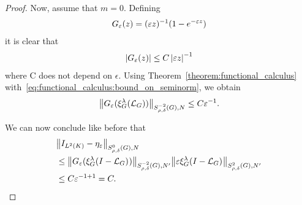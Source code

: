 \begin{proof}
    Now, assume that $m = 0$.
    Defining
    \begin{align*}
        G_\epsilon(z) = (\epsilon z)^{-1} (1 - \e^{-\epsilon z})
    \end{align*}
    it is clear that
    \begin{align*}
        \abs {G_\epsilon(z)} \leq C \abs {\epsilon z}^{-1}
    \end{align*}
    where C does not depend on $\epsilon$.
    Using Theorem~\ref{theorem:functional_calculus} with~\eqref{eq:functional_calculus:bound_on_seminorm},
    we obtain
    \begin{align*}
        \SymbolSemiNorm {-2} {\rho, \delta} N {G_\epsilon(\Rep \lambda (\Laplacian))}
        \leq C \epsilon^{-1}.
    \end{align*}

    We can now conclude like before that
    \begin{align*}
        &\SymbolSemiNorm {0} {\rho, \delta } N {\Id {\Lebesgue 2 \CompactGroup} - \eta_\epsilon}\\
        &\leq
        \SymbolSemiNorm {-2} {\rho, \delta} {N'} {G_\epsilon(\Rep \lambda \BesselPotentialSquared {})}
        \SymbolSemiNorm {2} {\rho, \delta} {N'} {\epsilon \Rep \lambda \BesselPotentialSquared {}}\\
        &\leq C \epsilon^{-1 + 1} = C.
    \end{align*}
\end{proof}

